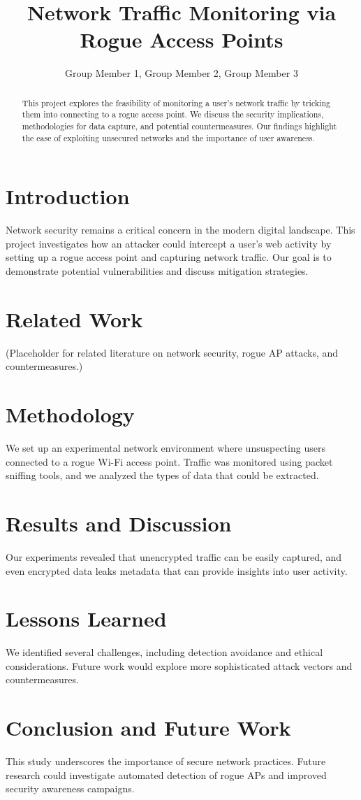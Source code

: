 \documentclass[sigconf]{acmart}
\title{Network Traffic Monitoring via Rogue Access Points}
\author{Group Member 1, Group Member 2, Group Member 3}
\affiliation{\institution{California Polytechnic State University, San Luis Obispo}}
\begin{document}
\begin{abstract}
This project explores the feasibility of monitoring a user's network traffic by tricking them into connecting to a rogue access point. We discuss the security implications, methodologies for data capture, and potential countermeasures. Our findings highlight the ease of exploiting unsecured networks and the importance of user awareness.
\end{abstract}

\maketitle

\section{Introduction}
Network security remains a critical concern in the modern digital landscape. This project investigates how an attacker could intercept a user's web activity by setting up a rogue access point and capturing network traffic. Our goal is to demonstrate potential vulnerabilities and discuss mitigation strategies.

\section{Related Work}
(Placeholder for related literature on network security, rogue AP attacks, and countermeasures.)

\section{Methodology}
We set up an experimental network environment where unsuspecting users connected to a rogue Wi-Fi access point. Traffic was monitored using packet sniffing tools, and we analyzed the types of data that could be extracted.

\section{Results and Discussion}
Our experiments revealed that unencrypted traffic can be easily captured, and even encrypted data leaks metadata that can provide insights into user activity.

\section{Lessons Learned}
We identified several challenges, including detection avoidance and ethical considerations. Future work would explore more sophisticated attack vectors and countermeasures.

\section{Conclusion and Future Work}
This study underscores the importance of secure network practices. Future research could investigate automated detection of rogue APs and improved security awareness campaigns.



\end{document}
